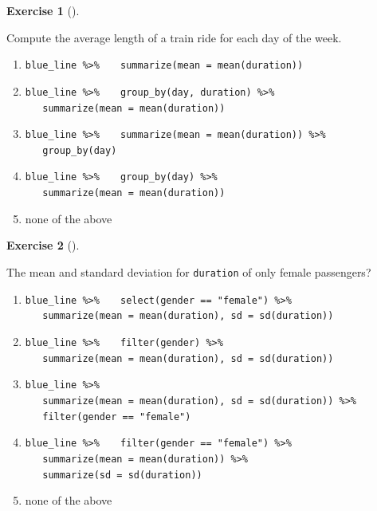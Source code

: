 \documentclass[
  letterpaper,
  DIV=11,
  numbers=noendperiod]{scrreprt}
\theoremstyle{definition}
\newtheorem{exercise}{Exercise}[chapter]
\theoremstyle{remark}
\begin{document}
\leavevmode{}%
\begin{exercise}[]\label{exr-ch03-c09}

Compute the average length of a train ride for each day of the week.

\begin{enumerate}
\def\labelenumi{\alph{enumi})}
\item
  \texttt{blue\_line\ \%\textgreater{}\%}
  \texttt{~~~summarize(mean\ =\ mean(duration))}
\item
  \texttt{blue\_line\ \%\textgreater{}\%}
  \texttt{~~~group\_by(day,\ duration)\ \%\textgreater{}\%}
  \texttt{~~~summarize(mean\ =\ mean(duration))}
\item
  \texttt{blue\_line\ \%\textgreater{}\%}
  \texttt{~~~summarize(mean\ =\ mean(duration))\ \%\textgreater{}\%}
  \texttt{~~~group\_by(day)}
\item
  \texttt{blue\_line\ \%\textgreater{}\%}
  \texttt{~~~group\_by(day)\ \%\textgreater{}\%}
  \texttt{~~~summarize(mean\ =\ mean(duration))}
\item
  none of the above
\end{enumerate}

\end{exercise}

\leavevmode{}%
\begin{exercise}[]\label{exr-ch03-c10}

The mean and standard deviation for \texttt{duration} of only female
passengers?

\begin{enumerate}
\def\labelenumi{\alph{enumi})}
\item
  \texttt{blue\_line\ \%\textgreater{}\%}
  \texttt{~~~select(gender\ ==\ "female")\ \%\textgreater{}\%}
  \texttt{~~~summarize(mean\ =\ mean(duration),\ sd\ =\ sd(duration))}
\item
  \texttt{blue\_line\ \%\textgreater{}\%}
  \texttt{~~~filter(gender)\ \%\textgreater{}\%}
  \texttt{~~~summarize(mean\ =\ mean(duration),\ sd\ =\ sd(duration))}
\item
  \texttt{blue\_line\ \%\textgreater{}\%}
  \texttt{~~~summarize(mean\ =\ mean(duration),\ sd\ =\ sd(duration))\ \%\textgreater{}\%}
  \texttt{~~~filter(gender\ ==\ "female")}
\item
  \texttt{blue\_line\ \%\textgreater{}\%}
  \texttt{~~~filter(gender\ ==\ "female")\ \%\textgreater{}\%}
  \texttt{~~~summarize(mean\ =\ mean(duration))\ \%\textgreater{}\%}
  \texttt{~~~summarize(sd\ =\ sd(duration))}
\item
  none of the above
\end{enumerate}

\end{exercise}
\end{document}
